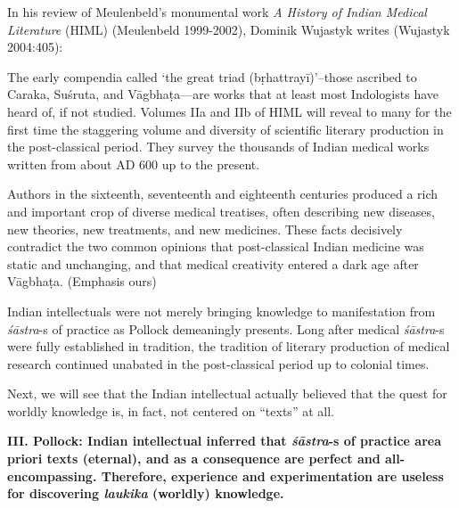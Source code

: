 In his review of Meulenbeld's monumental work {\sl A History of Indian Medical Literature} (HIML) (Meulenbeld 1999-2002), Dominik Wujastyk writes (Wujastyk 2004:405):
\begin{myquote}
The early compendia called `the great triad (bṛhattrayī)'--those ascribed to Caraka, Suśruta, and Vāgbhaṭa---are works that at least most Indologists have heard of, if not studied. Volumes IIa and IIb of HIML will reveal to many for the first time the staggering volume and diversity of scientific literary production in the post-classical period. They survey the thousands of Indian medical works written from about AD 600 up to the present. 

Authors in the sixteenth, seventeenth and eighteenth centuries produced a rich and important crop of diverse medical treatises, often describing new diseases, new theories, new treatments, and new medicines. These facts decisively contradict the two common opinions that post-classical Indian medicine was static and unchanging, and that medical creativity entered a dark age after Vāgbhaṭa. \hfill (Emphasis ours)
\end{myquote}

Indian intellectuals were not merely bringing knowledge to manifestation from {\sl śāstra}-s of practice as Pollock demeaningly presents.  Long after medical {\sl śāstra}-s were fully established in tradition, the tradition of literary production of medical research continued unabated in the post-classical period up to colonial times.

Next, we will see that the Indian intellectual actually believed that the quest for worldly knowledge is, in fact, not centered on ``texts'' at all.

{\bf III. Pollock: Indian intellectual inferred that {{\sl\bfseries śāstra}\relax}-s of practice area priori texts (eternal), and as a consequence are perfect and all-encompassing.  Therefore, experience and experimentation are useless for discovering {{\sl\bfseries laukika}\relax} (worldly) knowledge.}


